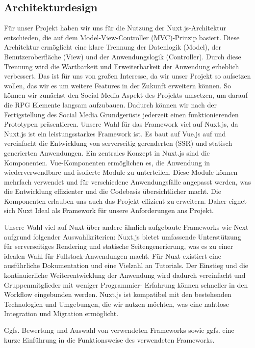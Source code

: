 \documentclass[a4paper,12pt]{article}
\begin{document}
\subsection{Architekturdesign}
Für unser Projekt haben wir uns für die Nutzung der Nuxt.js-Architektur entschieden, die auf dem Model-View-Controller (MVC)-Prinzip basiert. Diese Architektur ermöglicht eine klare Trennung der Datenlogik (Model), der Benutzeroberfläche (View) und der Anwendungslogik (Controller). Durch diese Trennung wird die Wartbarkeit und Erweiterbarkeit der Anwendung erheblich verbessert. Das ist für uns von großen Interesse, da wir unser Projekt so aufsetzen wollen, das wir es um weitere Features in der Zukunft erweitern können. So können wir zunächst den Social Media Aspekt des Projekts umsetzen, um darauf die RPG Elemente langsam aufzubauen. Dadurch können wir nach der Fertigstellung des Social Media Grundgerüsts jederzeit einen funktionierenden Prototypen präsentieren. 
Unsere Wahl für das Framework viel auf Nuxt.js, da
Nuxt.js ist ein leistungsstarkes Framework ist. Es baut auf Vue.js auf und vereinfacht  die Entwicklung von serverseitig gerenderten (SSR) und statisch generierten Anwendungen. Ein zentrales Konzept in Nuxt.js sind die Komponenten. Vue-Komponenten ermöglichen es, die Anwendung in wiederverwendbare und isolierte Module zu unterteilen. Diese Module können mehrfach verwendet und für verschiedene Anwendungsfälle angepasst werden, was die Entwicklung effizienter und die Codebasis übersichtlicher macht. Die Komponenten erlauben uns auch das Projekt effizient zu erweitern. Daher eignet sich Nuxt Ideal als Framework für unsere Anforderungen ans Projekt. 

Unsere Wahl viel auf Nuxt über andere ähnlich aufgebaute Frameworks wie Next aufgrund folgender Auswahlkriterien: 
Nuxt.js bietet umfassende Unterstützung für serverseitiges Rendering und statische Seitengenerierung, was es zu einer idealen Wahl für Fullstack-Anwendungen macht.
Für Nuxt existiert eine ausführliche Dokumentation und eine Vielzahl an Tutorials. Der Einstieg und die kontinuierliche Weiterentwicklung der Anwendung wird dadurch vereinfacht und Gruppenmitglieder mit weniger Programmier- Erfahrung können schneller in den Workflow eingebunden werden. 
Nuxt.js ist kompatibel mit den bestehenden Technologien und Umgebungen, die wir nutzen möchten, was eine nahtlose Integration und Migration ermöglicht. 

Ggfs. Bewertung und Auswahl von verwendeten Frameworks sowie ggfs. eine kurze
Einführung in die Funktionsweise des verwendeten Frameworks.
\end{document}
